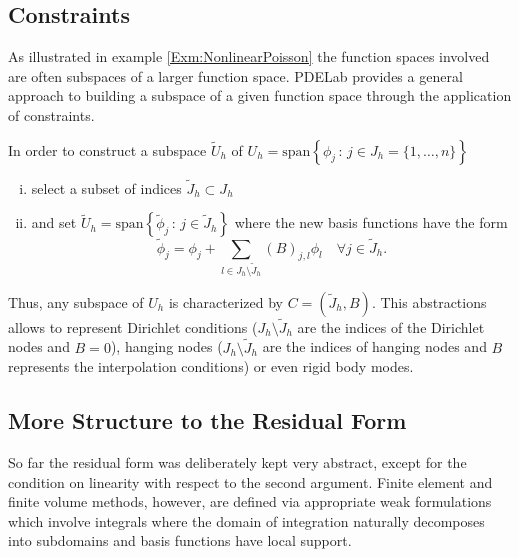 \documentclass[a4paper,12pt]{article}
\theoremstyle{definition}
\begin{document}
\subsection*{Constraints}

As illustrated in example \ref{Exm:NonlinearPoisson} the function spaces
involved are often subspaces of a larger function space. PDELab provides
a general approach to building a subspace of a given function space through
the application of constraints.

In order to construct a subspace $\tilde{U}_h$
of $U_h = \text{span}\left\{\phi_j \,:\, j\in J_h=\{1,\ldots,n\}\right\}$
\begin{enumerate}[i)]
\item select a subset of indices $\tilde{J}_h\subset J_h$
\item and set $\tilde{U}_h = \text{span}\left\{\tilde\phi_j \,:\, j\in \tilde{J}_h\right\}$
where the new basis functions have the form
\begin{equation*}
\tilde\phi_j = \phi_j + \sum_{l\in J_h\setminus\tilde{J}_h} (B)_{j,l} \phi_l \quad \forall j\in \tilde{J}_h.
\end{equation*}
\end{enumerate}
Thus, any subspace of $U_h$ is characterized by $C=(\tilde{J}_h,B)$.
This abstractions allows to represent Dirichlet conditions ($J_h\setminus\tilde{J}_h$
are the indices of the Dirichlet nodes and $B=0$), hanging nodes
($J_h\setminus\tilde{J}_h$ are the indices of hanging nodes and $B$ represents
the interpolation conditions) or even rigid body modes.

\subsection*{More Structure to the Residual Form}

So far the residual form was deliberately kept very abstract, except for
the condition on linearity with respect to the second argument.
Finite element and finite volume methods, however, are defined via
appropriate weak formulations which involve integrals where the domain
of integration naturally decomposes into subdomains and basis functions
have local support.
\end{document}
